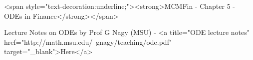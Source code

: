 <span style="text-decoration:underline;"><strong>MCMFin - Chapter 5 - ODEs in Finance</strong></span>

Lecture Notes on ODEs by Prof G Nagy (MSU) - <a title="ODE lecture notes" href="http://math.msu.edu/~gnagy/teaching/ode.pdf" target="_blank">Here</a>
